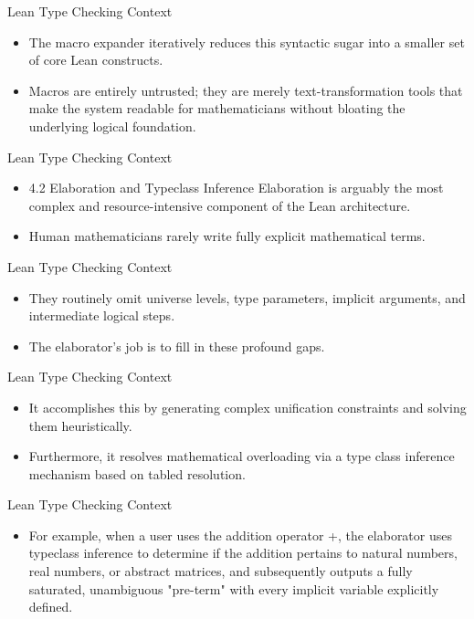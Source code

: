 \documentclass[10pt]{beamer}
\begin{document}
\begin{frame}{Lean Type Checking Context}
\begin{itemize}\setlength{\itemsep}{1.5em}
  \item The macro expander iteratively reduces this syntactic sugar into a smaller set of core Lean constructs.
  \item Macros are entirely untrusted; they are merely text-transformation tools that make the system readable for mathematicians without bloating the underlying logical foundation.
\end{itemize}
\end{frame}

\begin{frame}{Lean Type Checking Context}
\begin{itemize}\setlength{\itemsep}{1.5em}
  \item 4.2 Elaboration and Typeclass Inference Elaboration is arguably the most complex and resource-intensive component of the Lean architecture.
  \item Human mathematicians rarely write fully explicit mathematical terms.
\end{itemize}
\end{frame}

\begin{frame}{Lean Type Checking Context}
\begin{itemize}\setlength{\itemsep}{1.5em}
  \item They routinely omit universe levels, type parameters, implicit arguments, and intermediate logical steps.
  \item The elaborator's job is to fill in these profound gaps.
\end{itemize}
\end{frame}

\begin{frame}{Lean Type Checking Context}
\begin{itemize}\setlength{\itemsep}{1.5em}
  \item It accomplishes this by generating complex unification constraints and solving them heuristically.
  \item Furthermore, it resolves mathematical overloading via a type class inference mechanism based on tabled resolution.
\end{itemize}
\end{frame}

\begin{frame}{Lean Type Checking Context}
\begin{itemize}\setlength{\itemsep}{1.5em}
  \item For example, when a user uses the addition operator +, the elaborator uses typeclass inference to determine if the addition pertains to natural numbers, real numbers, or abstract matrices, and subsequently outputs a fully saturated, unambiguous "pre-term" with every implicit variable explicitly defined.
\end{itemize}
\end{frame}
\end{document}
